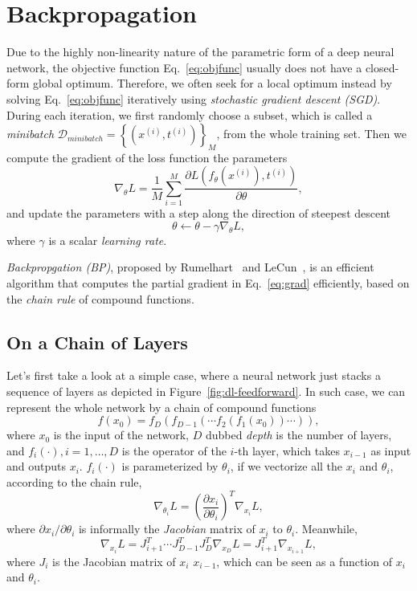 \section{Backpropagation} %
\label{sec:dl-bp}
Due to the highly non-linearity nature of the parametric form of a deep neural network, the objective function Eq.~\eqref{eq:objfunc} usually does not have a closed-form global optimum. Therefore, we often seek for a local optimum instead by solving Eq.~\eqref{eq:objfunc} iteratively using \emph{stochastic gradient descent (SGD)}. During each iteration, we first randomly choose a subset, which is called a \emph{minibatch} $\mathcal{D}_{minibatch} = \left\{\left(x^{(i)}, t^{(i)}\right)\right\}_M$, from the whole training set. Then we compute the gradient of the loss function \wrt the parameters
\begin{equation} \label{eq:grad}
  \nabla_\theta L = \frac{1}{M} \sum_{i=1}^M \frac{\partial L\left(f_\theta(x^{(i)}), t^{(i)}\right)}{\partial \theta},
\end{equation}
and update the parameters with a step along the direction of steepest descent
\begin{equation}
  \theta \gets \theta - \gamma \nabla_\theta L,
\end{equation}
where $\gamma$ is a scalar \emph{learning rate}.

\emph{Backpropgation (BP)}, proposed by Rumelhart~\cite{rumelhart1986learning} and LeCun~\cite{lecun1989backpropagation}, is an efficient algorithm that computes the partial gradient in Eq.~\eqref{eq:grad} efficiently, based on the \emph{chain rule} of compound functions.

\subsection{On a Chain of Layers} %
\label{sub:dl-bp-on-chain}
Let's first take a look at a simple case, where a neural network just stacks a sequence of layers as depicted in Figure~\ref{fig:dl-feedforward}. In such case, we can represent the whole network by a chain of compound functions
\begin{equation}
  f(x_0) = f_D(f_{D-1}(\cdots f_2(f_1(x_0))\cdots)),
\end{equation}
where $x_0$ is the input of the network, $D$ dubbed \emph{depth} is the number of layers, and $f_i(\cdot), i=1,\dots,D$ is the operator of the $i$-th layer, which takes $x_{i-1}$ as input and outputs $x_i$. $f_i(\cdot)$ is parameterized by $\theta_i$, if we vectorize all the $x_i$ and $\theta_i$, according to the chain rule,
\begin{equation} \label{eq:grad-params}
  \nabla_{\theta_i} L = \left(\frac{\partial x_i}{\partial \theta_i}\right)^T \nabla_{x_i}L,
\end{equation}
where $\partial x_i / \partial \theta_i$ is informally the \emph{Jacobian} matrix of $x_i$ \wrt to $\theta_i$. Meanwhile,
\begin{equation} \label{eq:grad-input}
  \nabla_{x_i}L = J_{i+1}^T \cdots J_{D-1}^T J_D^T \nabla_{x_D}L = J_{i+1}^T \nabla_{x_{i+1}}L,
\end{equation}
where $J_i$ is the Jacobian matrix of $x_i$ \wrt $x_{i-1}$, which can be seen as a function of $x_i$ and $\theta_i$.

